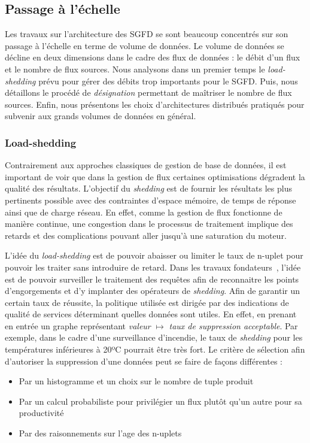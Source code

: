 \subsection{Passage à l'échelle}
Les travaux sur l'architecture des SGFD se sont beaucoup concentrés sur son passage à l'échelle en terme de volume de données. Le volume de données se décline en deux dimensions dans le cadre des flux de données : le débit d'un flux et le nombre de flux sources. Nous analysons dans un premier temps le \textit{load-shedding} prévu pour gérer des débits trop importants pour le SGFD. Puis, nous détaillons le procédé de \textit{désignation} permettant de maîtriser le nombre de flux sources. Enfin, nous présentons les choix d'architectures distribués pratiqués pour subvenir aux grands volumes de données en général.

\subsubsection{Load-shedding}
Contrairement aux approches classiques de gestion de base de données, il est important de voir que dans la gestion de flux certaines optimisations dégradent la qualité des résultats. L'objectif du \textit{shedding} est de fournir les résultats les plus pertinents possible avec des contraintes d'espace mémoire, de temps de réponse ainsi que de charge réseau. En effet, comme la gestion de flux fonctionne de manière continue, une congestion dans le processus de traitement implique des retards et des complications pouvant aller jusqu'à une saturation du moteur.

L'idée du \textit{load-shedding} est de pouvoir abaisser ou limiter le taux de n-uplet pour pouvoir les traiter sans introduire de retard. Dans les travaux fondateurs~\cite{Tatbul:window,Tatbul:load-shedding}, l'idée est de pouvoir surveiller le traitement des requêtes afin de reconnaitre les points d'engorgements et d'y implanter des opérateurs de \textit{shedding}. Afin de garantir un certain taux de réussite, la politique utilisée est dirigée par des indications de qualité de services déterminant quelles données sont utiles. En effet, en prenant en entrée un graphe représentant \textit{valeur} $\mapsto$  \textit{taux de suppression acceptable}. Par exemple, dans le cadre d'une surveillance d'incendie, le taux de \textit{shedding} pour les températures inférieures à 20ºC pourrait être très fort. Le critère de sélection afin d'autoriser la suppression d'une données peut se faire de façons différentes :
\begin{itemize}
 \item Par un histogramme et un choix sur le nombre de tuple produit~\cite{Han:join}
 \item Par un calcul probabiliste pour privilégier un flux plutôt qu'un autre pour sa productivité~\cite{Han:join}
 \item Par des raisonnements sur l'age des n-uplets~\cite{Srivastava:join}
\end{itemize}

